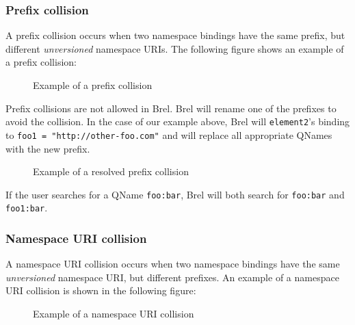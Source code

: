 \subsubsection{Prefix collision}

A prefix collision occurs when two namespace bindings have the same prefix, but different \textit{unversioned} namespace URIs.
The following figure shows an example of a prefix collision:

\begin{figure}[H]
    \caption{Example of a prefix collision}
    \label{fig:prefix_collision_example}
\end{figure}

Prefix collisions are not allowed in Brel. Brel will rename one of the prefixes to avoid the collision.
In the case of our example above, Brel will \texttt{element2}'s binding to \texttt{foo1 = "http://other-foo.com"} and will replace all appropriate QNames with the new prefix.

\begin{figure}[H]
    \caption{Example of a resolved prefix collision}
    \label{fig:prefix_collision_example_renamed}
\end{figure}

If the user searches for a QName \texttt{foo:bar}, Brel will both search for \texttt{foo:bar} and \texttt{foo1:bar}.

\subsubsection{Namespace URI collision}

A namespace URI collision occurs when two namespace bindings have the same \textit{unversioned} namespace URI, 
but different prefixes.
An example of a namespace URI collision is shown in the following figure:

\begin{figure}[H]
    \caption{Example of a namespace URI collision}
    \label{fig:namespace_uri_collision_example}
\end{figure}

